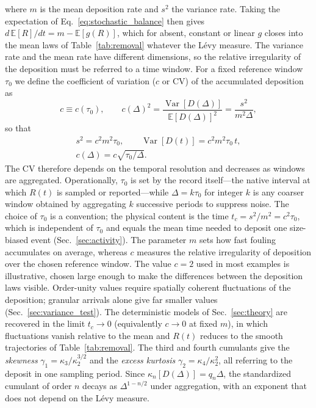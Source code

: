 \documentclass[preprint,12pt]{elsarticle}
\begin{document}
where $m$ is the mean deposition rate and $s^2$ the variance rate. Taking
the expectation of Eq.~\eqref{eq:stochastic_balance} then gives
$d\,\mathbb E[R]/dt=m-\mathbb E[g(R)]$, which for absent, constant or linear
$g$ closes into the mean laws of Table~\ref{tab:removal} whatever the L\'evy
measure. The
variance rate and the mean rate have different dimensions, so the relative
irregularity of the deposition must be referred to a time window. For a fixed
reference window $\tau_0$ we define the coefficient of variation ($c$ or CV)
of the accumulated deposition as
\begin{equation}
  c\equiv c(\tau_0),\qquad
  c(\Delta)^2=\frac{\operatorname{Var}[D(\Delta)]}{\mathbb E[D(\Delta)]^2}
  =\frac{s^2}{m^2\Delta},
  \label{eq:cv_reference_interval}
\end{equation}
so that
\begin{equation}
\begin{gathered}
  s^2=c^2m^2\tau_0,\qquad
  \operatorname{Var}[D(t)]=c^2m^2\tau_0\,t,\\[2pt]
  c(\Delta)=c\sqrt{\tau_0/\Delta}.
\end{gathered}
  \label{eq:deposition_variance}
\end{equation}
The CV therefore depends on the temporal resolution and decreases as windows
are aggregated. Operationally, $\tau_0$ is set by the record itself---the
native interval at which $R(t)$ is sampled or reported---while $\Delta=k\tau_0$
for integer $k$ is any coarser window obtained by aggregating $k$ successive
periods to suppress noise. The choice of $\tau_0$ is a convention; the physical content is
the time $t_c=s^2/m^2=c^2\tau_0$, which is independent of $\tau_0$ and
equals the mean time needed to deposit one size-biased event (Sec.~\ref{sec:activity}).
The parameter $m$ sets how fast fouling accumulates on average, whereas $c$
measures the relative irregularity of deposition over the chosen reference
window. The value $c=2$ used in most examples is illustrative, chosen
large enough to make the differences between the deposition laws visible.
Order-unity values require spatially coherent fluctuations of the deposition;
granular arrivals alone give far smaller values
(Sec.~\ref{sec:variance_test}). The deterministic models of Sec.~\ref{sec:theory} are recovered in
the limit $t_c\to0$ (equivalently $c\to0$ at fixed $m$), in which
fluctuations vanish relative to the mean and $R(t)$ reduces to the smooth
trajectories of Table~\ref{tab:removal}.
The third and fourth cumulants give the \emph{skewness} $\gamma_1=\kappa_3/\kappa_2^{3/2}$ and the
\emph{excess kurtosis} $\gamma_2=\kappa_4/\kappa_2^2$,
all referring to the deposit in one sampling period.
Since $\kappa_n[D(\Delta)]=q_n\Delta$, the standardized cumulant of order $n$
decays as $\Delta^{1-n/2}$ under aggregation, with an exponent that does not
depend on the L\'evy measure.
 
\end{document}
